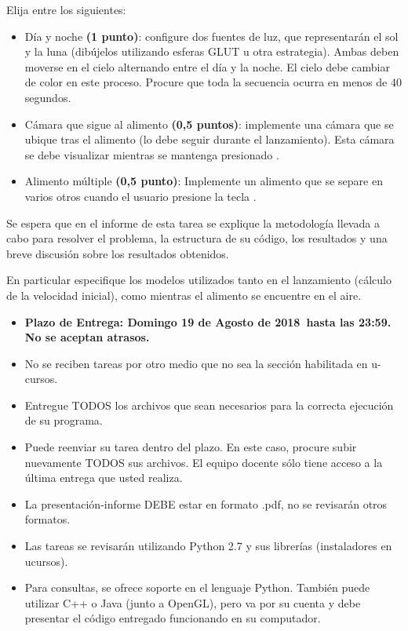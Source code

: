 \documentclass[letterpaper,11pt]{article} %
\def\plazoentrega {Domingo 19 de Agosto de 2018}
\begin{document}

Elija entre los siguientes:

\begin{itemize}
	\item Día y noche \textbf{(1 punto)}: configure dos fuentes de luz, que representarán el sol y la luna (dibújelos utilizando esferas GLUT u otra estrategia). Ambas deben moverse en el cielo alternando entre el día y la noche. El cielo debe cambiar de color en este proceso. Procure que toda la secuencia ocurra en menos de 40 segundos.
	\item Cámara que sigue al alimento \textbf{(0,5 puntos)}: implemente una cámara que se ubique tras el alimento (lo debe seguir durante el lanzamiento). Esta cámara se debe visualizar mientras se mantenga presionado .
	\item Alimento múltiple \textbf{(0,5 punto)}: Implemente un alimento que se separe en varios otros cuando el usuario presione la tecla .
\end{itemize}


Se espera que en el informe de esta tarea se explique la metodología llevada a cabo para resolver el problema, la estructura de su código, los resultados y una breve discusión sobre los resultados obtenidos. 

\newp En particular especifique los modelos utilizados tanto en el lanzamiento (cálculo de la velocidad inicial), como mientras el alimento se encuentre en el aire.


\begin{itemize}
	\item \textbf{Plazo de Entrega: \plazoentrega \ hasta las 23:59. No se aceptan atrasos.}
	\item No se reciben tareas por otro medio que no sea la sección habilitada en u-cursos.
	\item Entregue TODOS los archivos que sean necesarios para la correcta ejecución de su programa.
	\item Puede reenviar su tarea dentro del plazo. En este caso, procure subir nuevamente TODOS sus archivos. El equipo docente sólo tiene acceso a la última entrega que usted realiza.
	\item La presentación-informe DEBE estar en formato .pdf, no se revisarán otros formatos.
	\item Las tareas se revisarán utilizando Python 2.7 y sus librerías (instaladores en ucursos).
	\item Para consultas, se ofrece soporte en el lenguaje Python. También puede utilizar C++ o Java (junto a OpenGL), pero va por su cuenta y debe presentar el código entregado funcionando en su computador.
\end{itemize}
\end{document}
